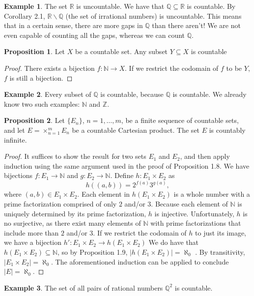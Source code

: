 \documentclass{article}
\newcommand{\N}{\mathbb{N}}
\newcommand{\R}{\mathbb{R}}
\newcommand{\Q}{\mathbb{Q}}
\newcommand{\Z}{\mathbb{Z}}
\theoremstyle{definition}
\newtheorem{proposition}{Proposition}[section]
\newtheorem{example}{Example}[section]
\begin{document}
	\begin{example}
		The set $ \R $ is uncountable. We have that $ \Q\subseteq \R $ is countable. By Corollary 2.1, $ \R\backslash \Q $ (the set of irrational numbers) is uncountable. This means that in a certain sense, there are more gaps in $ \Q $ than there aren't! We are not even capable of counting all the gaps, whereas we can count $ \Q $. 
	\end{example}
	\begin{proposition}
		Let $ X $ be a countable set. Any subset $ Y\subseteq X $ is countable
	\end{proposition}
	\begin{proof}
		There exists a bijection $ f:\N\to X $. If we restrict the codomain of $ f $ to be $ Y $, $ f $ is still a bijection. 
	\end{proof}
	\begin{example}
		Every subset of $ \Q $ is countable, because $ \Q $ is countable. We already know two such examples: $ \N $ and $ \Z $. 
	\end{example}
	\begin{proposition}
		Let $ \{E_n\} $, $ n=1,\ldots,m $, be a finite sequence of countable sets, and let $ E=\times_{n=1}^mE_n $ be a countable Cartesian product. The set $ E $ is countably infinite. 
	\end{proposition}
	\begin{proof}
		It suffices to show the result for two sets $ E_1 $ and $ E_2 $, and then apply induction using the same argument used in the proof of Proposition 1.8. We have bijections $ f:E_1\to\N$ and $ g:E_2\to\N $. Define $ h:E_1\times E_2 $ as $$ h((a,b))=2^{f(a)}3^{g(a)},$$ where $ (a,b)\in E_1\times E_2 $. Each element in $ h(E_1\times E_2) $ is a whole number with a prime factorization comprised of only $ 2 $ and/or $ 3 $. Because each element of $ \N $ is uniquely determined by its prime factorization, $ h $ is injective. Unfortunately, $ h $ is no surjective, as there exist many elements of $ \N $ with prime factorizations that include more than $ 2 $ and/or $ 3 $. If we restrict the codomain of $ h $ to just its image, we have a bijection $ h':E_1\times E_2\to  h(E_1\times E_2) $  We do have that $ h(E_1\times E_2)\subseteq \N  $, so by Proposition 1.9, $ |h(E_1\times E_2)|=\aleph_0 $ . By transitivity, $ |E_1\times E_2|=\aleph_0 $. The aforementioned induction can be applied to conclude $ |E|=\aleph_0 $. 
	\end{proof}
	\begin{example}
		The set of all pairs of rational numbers $ \Q^2 $ is countable.
	\end{example}
\end{document}
